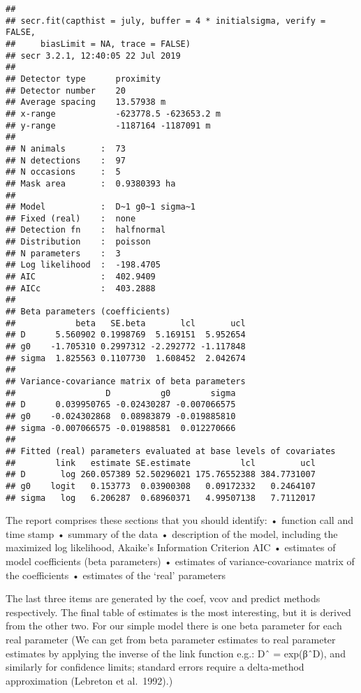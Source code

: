 \documentclass[]{article}
\begin{document}
\begin{verbatim}
## 
## secr.fit(capthist = july, buffer = 4 * initialsigma, verify = FALSE, 
##     biasLimit = NA, trace = FALSE)
## secr 3.2.1, 12:40:05 22 Jul 2019
## 
## Detector type      proximity 
## Detector number    20 
## Average spacing    13.57938 m 
## x-range            -623778.5 -623653.2 m 
## y-range            -1187164 -1187091 m 
## 
## N animals       :  73  
## N detections    :  97 
## N occasions     :  5 
## Mask area       :  0.9380393 ha 
## 
## Model           :  D~1 g0~1 sigma~1 
## Fixed (real)    :  none 
## Detection fn    :  halfnormal
## Distribution    :  poisson 
## N parameters    :  3 
## Log likelihood  :  -198.4705 
## AIC             :  402.9409 
## AICc            :  403.2888 
## 
## Beta parameters (coefficients) 
##            beta   SE.beta       lcl       ucl
## D      5.560902 0.1998769  5.169151  5.952654
## g0    -1.705310 0.2997312 -2.292772 -1.117848
## sigma  1.825563 0.1107730  1.608452  2.042674
## 
## Variance-covariance matrix of beta parameters 
##                  D          g0        sigma
## D      0.039950765 -0.02430287 -0.007066575
## g0    -0.024302868  0.08983879 -0.019885810
## sigma -0.007066575 -0.01988581  0.012270666
## 
## Fitted (real) parameters evaluated at base levels of covariates 
##        link   estimate SE.estimate          lcl         ucl
## D       log 260.057389 52.50296021 175.76552388 384.7731007
## g0    logit   0.153773  0.03900308   0.09172332   0.2464107
## sigma   log   6.206287  0.68960371   4.99507138   7.7112017
\end{verbatim}

The report comprises these sections that you should identify: • function
call and time stamp • summary of the data • description of the model,
including the maximized log likelihood, Akaike's Information Criterion
AIC • estimates of model coefficients (beta parameters) • estimates of
variance-covariance matrix of the coefficients • estimates of the `real'
parameters

The last three items are generated by the coef, vcov and predict methods
respectively. The final table of estimates is the most interesting, but
it is derived from the other two. For our simple model there is one beta
parameter for each real parameter (We can get from beta parameter
estimates to real parameter estimates by applying the inverse of the
link function e.g.: Dˆ = exp(βˆD), and similarly for confidence limits;
standard errors require a delta-method approximation (Lebreton et
al.~1992).)
\end{document}
